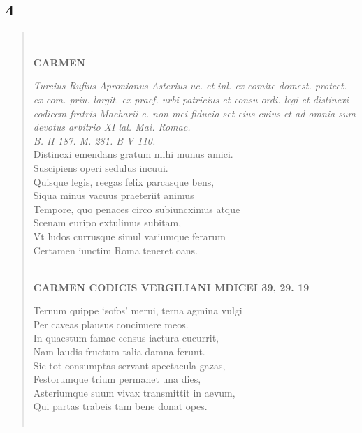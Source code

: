 \documentclass[11pt, a4paper]{report}
\begin{document}
            \subsection*{4}
      \begin{verse}
      
        ﻿\pagebreak 
    \begin{center} \textbf{CARMEN} \end{center}\textit{
                    Turcius Rufius Apronianus Asterius uc. et inl. ex comite domest.
                    protect. ex com. priu. largit. ex praef. urbi patricius et consu ordi. legi
                    et distincxi codicem fratris Macharii c. non mei fiducia set eius cuius et
                    ad omnia sum devotus arbitrio XI lal. Mai. Romac. } \\ \textit{B. II 187. M. 281. B V 110.} \\ Distincxi emendans gratum mihi munus amici. \\ Suscipiens operi sedulus incuui. \\ Quisque legis, reegas felix parcasque bens, \\ Siqua minus vacuus praeteriit animus \\ Tempore, quo penaces circo subiuncximus atque \\ Scenam euripo extulimus subitam, \\ Vt ludos currusque simul variumque ferarum \\ Certamen iunctim Roma teneret oans. \\ 
        ﻿\pagebreak 
    \begin{center} \textbf{CARMEN CODICIS VERGILIANI MDICEI 39, 29. 19} \end{center}Ternum quippe ‘sofos’ merui, terna agmina vulgi \\ Per caveas plausus concinuere meos. \\ In quaestum famae census iactura cucurrit, \\ Nam laudis fructum talia damna ferunt. \\ Sic tot consumptas servant spectacula gazas, \\ Festorumque trium permanet una dies, \\ Asteriumque suum vivax transmittit in aevum, \\ Qui partas trabeis tam bene donat opes. \\ 
        ﻿\pagebreak 

\end{verse}
\end{document}
